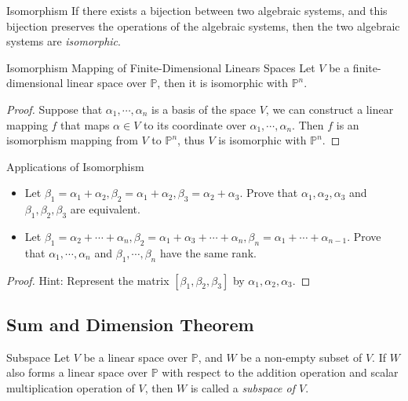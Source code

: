 \begin{definition}{Isomorphism}{}
  If there exists a bijection between two algebraic systems,
  and this bijection preserves the operations of the algebraic systems,
  then the two algebraic systems are \emph{isomorphic}.
\end{definition}

\begin{theorem}{Isomorphism Mapping of Finite-Dimensional Linears Spaces}{}
  Let $V$ be a finite-dimensional linear space over $\mathbb{P}$,
  then it is isomorphic with $\mathbb{P}^n$.
\end{theorem}

\begin{proof}
  Suppose that $\alpha_1, \cdots, \alpha_n$ is a basis of the space $V$,
  we can construct a linear mapping $f$ that maps $\alpha \in V$ to
  its coordinate over $\alpha_1, \cdots, \alpha_n$.
  Then $f$ is an isomorphism mapping from $V$ to $\mathbb{P}^n$,
  thus $V$ is isomorphic with $\mathbb{P}^n$.
\end{proof}

\begin{example}{Applications of Isomorphism}{}
  \begin{itemize}
  \item Let $\beta_1 = \alpha_1 + \alpha_2, \beta_2 = \alpha_1 + \alpha_2,
    \beta_3 = \alpha_2 + \alpha_3$. Prove that $\alpha_1, \alpha_2, \alpha_3$
    and $\beta_1, \beta_2, \beta_3$ are equivalent.
  \item Let $\beta_1 = \alpha_2 + \cdots + \alpha_n,
    \beta_2 = \alpha_1 + \alpha_3 + \cdots + \alpha_n,
    \beta_n = \alpha_1 + \cdots + \alpha_{n-1}$.
    Prove that $\alpha_1, \cdots, \alpha_n$ and $\beta_1, \cdots, \beta_n$ have
    the same rank.
  \end{itemize}
\end{example}

\begin{proof}
  Hint: Represent the matrix $[\beta_1, \beta_2, \beta_3]$ by $\alpha_1, \alpha_2, \alpha_3$.
\end{proof}

\subsection{Sum and Dimension Theorem}

\begin{definition}{Subspace}{}
  Let $V$ be a linear space over $\mathbb{P}$,
  and $W$ be a non-empty subset of $V$.
  If $W$ also forms a linear space over $\mathbb{P}$ with respect to
  the addition operation and scalar multiplication operation of $V$,
  then $W$ is called a \emph{subspace of $V$}.
\end{definition}

